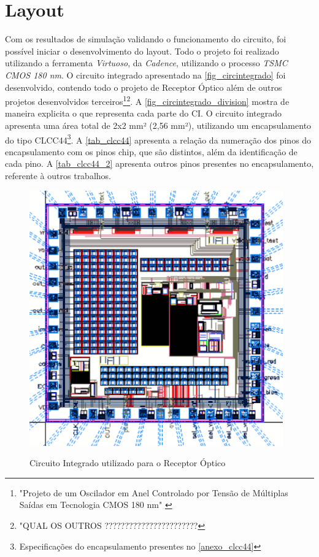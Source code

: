 \section{Layout}

Com os resultados de simulação validando o funcionamento do circuito, foi possível iniciar o desenvolvimento do layout. Todo o projeto foi realizado utilizando a ferramenta \textit{Virtuoso}, da \textit{Cadence}, utilizando o processo \textit{TSMC CMOS 180 nm}. O circuito integrado apresentado na \autoref{fig_circintegrado} foi desenvolvido, contendo todo o projeto de Receptor Óptico além de outros projetos desenvolvidos terceiros\footnote{"Projeto de um Oscilador em Anel Controlado por Tensão de Múltiplas Saídas em Tecnologia CMOS 180 nm" \cite{VictorRodrigues}}\footnote{"QUAL OS OUTROS ???????????????????????}. A \autoref{fig_circintegrado_division} mostra de maneira explicita o que representa cada parte do CI. O circuito integrado apresenta uma área total de 2x2 mm² (2,56 mm²), utilizando um encapsulamento do tipo CLCC44\footnote{Especificações do encapsulamento presentes no \autoref{anexo_clcc44}}. A \autoref{tab_clcc44} apresenta a relação da numeração dos pinos do encapsulamento com os pinos chip, que são distintos, além da identificação de cada pino. A \autoref{tab_clcc44_2} apresenta outros pinos presentes no encapsulamento, referente à outros trabalhos.

\begin{figure}[!h]
 \centering
    \caption{Circuito Integrado utilizado para o Receptor Óptico} 
    \includegraphics[scale=0.5]{Resultados/Imagens/CircuitoIntegrado.png}
    \label{fig_circintegrado}
\end{figure}

